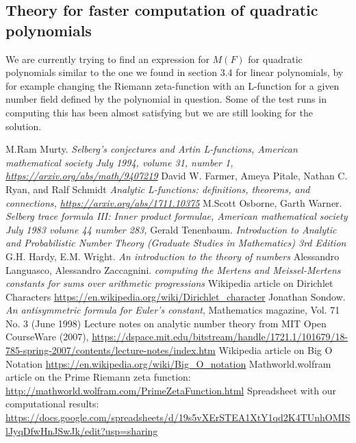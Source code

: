 \documentclass{article}
\theoremstyle{definition}
\theoremstyle{remark}
\begin{document}
\subsection{Theory for faster computation of quadratic polynomials}
We are currently trying to find an expression for $M(F)$ for quadratic polynomials similar to the one we found in section 3.4 for linear polynomials, by for example changing the Riemann zeta-function with an L-function for a given number field defined by the polynomial in question. Some of the test runs in computing this has been almost satisfying but we are still looking for the solution.


\newpage



\begin{thebibliography}{9}
\label{refMurty}
M.Ram Murty. \textit{Selberg's conjectures and Artin L-functions, American mathematical society July 1994, volume 31, number 1, \url{https://arxiv.org/abs/math/9407219}}
David W. Farmer, Ameya Pitale, Nathan C. Ryan,
and Ralf Schmidt \textit{Analytic L-functions: definitions,
theorems, and connections, \url{https://arxiv.org/abs/1711.10375}}
M.Scott Osborne, Garth Warner. \textit{Selberg trace formula III: Inner product formulae, American mathematical society July 1983 volume 44 number 283, }
 \label{refTenenbaum}
Gerald Tenenbaum. \textit{Introduction to Analytic and Probabilistic Number Theory (Graduate Studies in Mathematics) 3rd Edition
}
G.H. Hardy, E.M. Wright. \textit{An introduction to the theory of numbers}
Alessandro Languasco, Alessandro Zaccagnini. \textit{computing the Mertens and Meissel-Mertens constants for sums over arithmetic progressions}
 Wikipedia article on Dirichlet Characters \url{https://en.wikipedia.org/wiki/Dirichlet_character}
\label{sondowRef}
Jonathan Sondow. \textit{An antisymmetric formula for Euler's constant}, Mathematics magazine, Vol. 71 No. 3 (June 1998)
Lecture notes on analytic number theory from MIT Open CourseWare (2007), \url{https://dspace.mit.edu/bitstream/handle/1721.1/101679/18-785-spring-2007/contents/lecture-notes/index.htm}
Wikipedia article on Big O Notation \url{https://en.wikipedia.org/wiki/Big_O_notation}
 Mathworld.wolfram article on the Prime Riemann zeta function: \url{http://mathworld.wolfram.com/PrimeZetaFunction.html}
 \label{refSpreadsheet} Spreadsheet with our computational results: \url{https://docs.google.com/spreadsheets/d/19s5vXErSTEA1XtY1qd2K4TUnhOMISlJyqDfwHnJSwJk/edit?usp=sharing}

\end{thebibliography}
\end{document}
